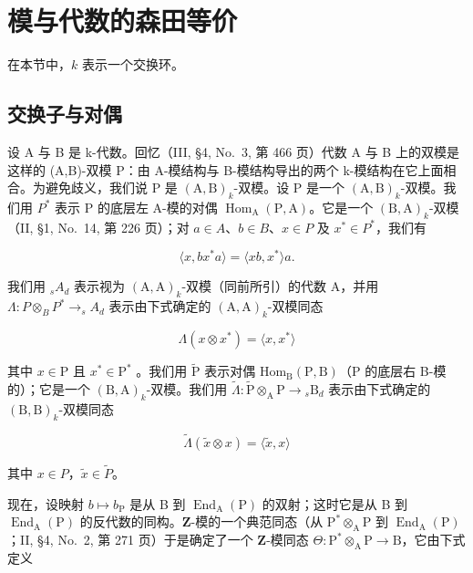 \section{模与代数的森田等价}

在本节中，\(k\) 表示一个交换环。

\subsection{交换子与对偶}

设 A 与 B 是 k-代数。回忆（III, §4, No.~3, 第 466 页）代数 A 与 B 上的双模是这样的 (A,B)-双模 P：由 A-模结构与 B-模结构导出的两个 k-模结构在它上面相合。为避免歧义，我们说 P 是 \((\mathrm{A},\mathrm{B})_{k}\)-双模。设 P 是一个 \((\mathrm{A},\mathrm{B})_{k}\)-双模。我们用 \(P^{*}\) 表示 P 的底层左 A-模的对偶 \(\operatorname{Hom}_{\mathrm{A}}(\mathrm{P},\mathrm{A})\)。它是一个 \((\mathrm{B},\mathrm{A})_{k}\)-双模（II, §1, No.~14, 第 226 页）；对 \(a \in A\)、\(b \in B\)、\(x \in P\) 及 \(x^{*} \in P^{*}\)，我们有

\[
\langle x, b x ^ {*} a \rangle = \langle x b, x ^ {*} \rangle a.\tag{1}
\]

我们用 \(_{s}A_{d}\) 表示视为 \((\mathrm{A},\mathrm{A})_{k}\)-双模（同前所引）的代数 A，并用 \(\Lambda:P\otimes_{B}P^{*}\to_{s}A_{d}\) 表示由下式确定的 \((\mathrm{A},\mathrm{A})_{k}\)-双模同态

\[
\Lambda (x \otimes x ^ {*}) = \langle x, x ^ {*} \rangle\tag{2}
\]

其中 \(x \in \mathrm{P}\) 且 \(x^{*} \in \mathrm{P}^{*}\) 。我们用 \(\widetilde{\mathrm{P}}\) 表示对偶 \(\mathrm{Hom}_{\mathrm{B}}(\mathrm{P},\mathrm{B})\)（\(\mathrm{P}\) 的底层右 B-模的）；它是一个 \((\mathrm{B},\mathrm{A})_{k}\)-双模。我们用 \(\widetilde{\Lambda}: \widetilde{\mathrm{P}} \otimes_{\mathrm{A}} \mathrm{P} \to {}_{s}\mathrm{B}_{d}\) 表示由下式确定的 \((\mathrm{B},\mathrm{B})_{k}\)-双模同态

\[
\widetilde {\Lambda} (\widetilde {x} \otimes x) = \langle \widetilde {x}, x \rangle\tag{3}
\]

其中 \(x \in P\)，\(\widetilde{x} \in \widetilde{P}\)。

现在，设映射 \(b \mapsto b_{\mathrm{P}}\) 是从 B 到 \(\operatorname{End}_{\mathrm{A}}(\mathrm{P})\) 的双射；这时它是从 B 到 \(\operatorname{End}_{\mathrm{A}}(\mathrm{P})\) 的反代数的同构。\(\mathbf{Z}\)-模的一个典范同态（从 \(\mathrm{P}^* \otimes_{\mathrm{A}} \mathrm{P}\) 到 \(\operatorname{End}_{\mathrm{A}}(\mathrm{P})\)；II, §4, No.~2, 第 271 页）于是确定了一个 \(\mathbf{Z}\)-模同态 \(\Theta: \mathrm{P}^* \otimes_{\mathrm{A}} \mathrm{P} \to \mathrm{B}\)，它由下式定义


